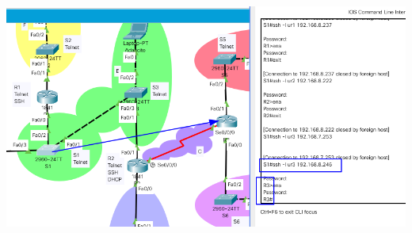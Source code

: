 \documentclass{article}
\begin{document}
\begin{enumerate}[label=\textbf{\arabic*.}]
  \includegraphics[width=0.8\linewidth]{ssh-s1-r3.png}\\[3mm]
\end{enumerate}
\end{document}
